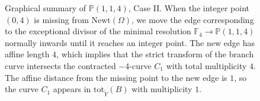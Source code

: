 \documentclass{article}
\begin{document}
\begin{figure}[h]
    \centering
    \caption{Graphical summary of $\mathbb{P}(1,1,4)$, Case II. When the integer point $(0,4)$ is missing from $\mathrm{Newt}(\Omega)$, we move the edge corresponding to the exceptional divisor of the minimal resolution $\mathbb{F}_4\to\mathbb{P}(1,1,4)$ normally inwards until it reaches an integer point. The new edge has affine length $4$, which implies that the strict transform of the branch curve intersects the contracted $-4$-curve $C_1$ with total multiplicity $4$. The affine distance from the missing point to the new edge is $1$, so the curve $C_1$ appears in $\mathrm{tot}_{\tilde{Y}}(B)$ with multiplicity $1$.}
    \label{fig:summary}
\end{figure}
\end{document}
